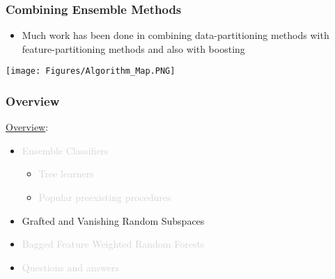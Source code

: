 \documentclass{beamer}
\begin{document}

\begin{frame}

    \frametitle{Combining Ensemble Methods}
    
    \begin{itemize}
        \item Much work has been done in combining data-partitioning methods 
              with feature-partitioning methods and also with boosting
    \end{itemize}
    
    \begin{center}
        \texttt{[image: Figures/Algorithm\_Map.PNG]}
    \end{center}
    
\end{frame}



\begin{frame}

    \frametitle{Overview}
    
    \underline{Overview}:
    \medskip
    
    \begin{itemize}
        \item \textcolor{lightgray} {Ensemble Classifiers}
            \begin{itemize}
                \item \textcolor{lightgray} {Tree learners}
                \item \textcolor{lightgray} {Popular preexisting procedures}
            \end{itemize}
            \medskip
        \item Grafted and Vanishing Random Subspaces
            \medskip
        \item \textcolor{lightgray} 
            {Bagged Feature Weighted Random Forests}
            \medskip
        \item \textcolor{lightgray} {Questions and answers}
    \end{itemize}
    
\end{frame}

\end{document}
